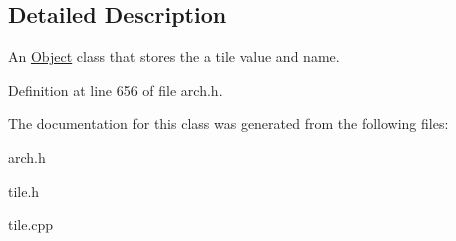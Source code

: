 \subsection{Detailed Description}
An \hyperlink{classObject}{Object} class that stores the a tile value and name. 

Definition at line 656 of file arch.\+h.



The documentation for this class was generated from the following files\+:\begin{DoxyCompactItemize}
\item 
arch.\+h\item 
tile.\+h\item 
tile.\+cpp\end{DoxyCompactItemize}
